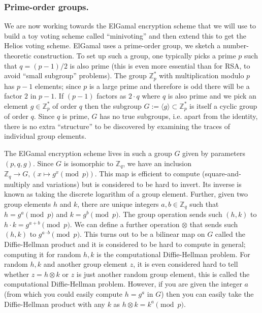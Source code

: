 \documentclass{llncs}
\begin{document}
\subsubsection{Prime-order groups.}
We are now working towards the ElGamal encryption scheme that we will use to
build a toy voting scheme called ``minivoting'' and then extend this to get the
Helios voting scheme. ElGamal uses a prime-order group, we sketch a
number-theoretic construction. To set up such a group, one typically picks a
prime $p$ such that $q = (p-1)/2$ is also prime (this is even more essential
than for RSA, to avoid ``small subgroup'' problems). The group $\mathbb Z^*_p$
with multiplication modulo $p$ has $p - 1$ elements; since $p$ is a large prime
and therefore is odd there will be a factor $2$ in $p-1$. If $(p-1)$ factors as
$2 \cdot q$ where $q$ is also prime and we pick an element $g \in \mathbb Z^*_p$
of order $q$ then the subgroup $G := \langle g \rangle \subset \mathbb Z^*_p$ is
itself a cyclic group of order $q$. Since $q$ is prime, $G$ has no true
subgroups, i.e. apart from the identity, there is no extra ``structure'' to be
discovered by examining the traces of individual group elements\footnotemark.

The ElGamal encryption scheme lives in such a group $G$ given by parameters $(p,
q, g)$. Since $G$ is isomorphic to $\mathbb Z_q$, we have an inclusion $\mathbb
Z_q \to G, (x \mapsto g^x \pmod{p})$. This map is efficient to compute
(square-and-multiply and variations) but is considered to be hard to invert. Its
inverse is known as taking the discrete logarithm of a group element. Further,
given two group elements $h$ and $k$, there are unique integers $a, b \in
\mathbb Z_q$ such that $h = g^a \pmod{p}$ and $k = g^b \pmod{p}$. The group
operation sends such $(h, k)$ to $h \cdot k = g^{a + b} \pmod{p}$. We can define
a further operation $\otimes$ that sends such $(h, k)$ to $g^{a \cdot b}
\pmod{p}$. This turns out to be a bilinear map on $G$ called the Diffie-Hellman
product and it is considered to be hard to compute in general; computing it for
random $h, k$ is the computational Diffie-Hellman problem. For random $h, k$ and
another group element $z$, it is even considered hard to tell whether $z = h
\otimes k$ or $z$ is just another random group element, this is called the
computational Diffie-Hellman problem. However, if you are given the integer $a$
(from which you could easily compute $h = g^a$ in $G$) then you can easily take
the Diffie-Hellman product with any $k$ as $h \otimes k = k^a \pmod{p}$.
\end{document}
